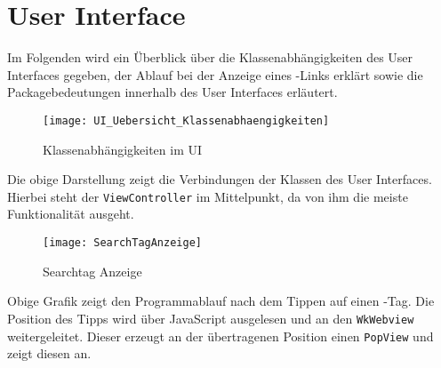 
\chapter{User Interface}

Im Folgenden wird ein Überblick über die Klassenabhängigkeiten des User Interfaces gegeben, der Ablauf bei der Anzeige eines \SEARCH-Links erklärt sowie die Packagebedeutungen innerhalb des User Interfaces erläutert.

\begin{figure}[h]
	\centering
	\texttt{[image: UI\_Uebersicht\_Klassenabhaengigkeiten]}
	\caption{Klassenabhängigkeiten im UI}
\end{figure}

Die obige Darstellung zeigt die Verbindungen der Klassen des User Interfaces. Hierbei steht der \lstinline|ViewController| im Mittelpunkt, da von ihm die meiste Funktionalität ausgeht.

\begin{figure}[ht]
	\centering
	\texttt{[image: SearchTagAnzeige]}
	\caption{Searchtag Anzeige}
\end{figure}

Obige Grafik zeigt den Programmablauf nach dem Tippen auf einen \SEARCH-Tag. Die Position des Tipps wird über JavaScript ausgelesen und an den \lstinline|WkWebview| weitergeleitet. Dieser erzeugt an der übertragenen Position einen \lstinline|PopView| und zeigt diesen an. 


\newpage

\newpage

\newpage

\newpage

\newpage


